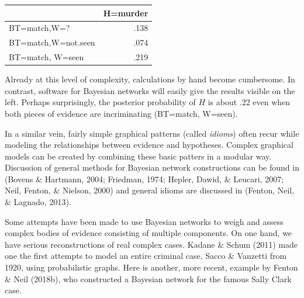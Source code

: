 \documentclass[11pt,dvipsnames,enabledeprecatedfontcommands]{scrartcl}
\begin{document}
\vspace{1mm}

\begin{minipage}[c]{0.4\linewidth}
\begin{tabular}{lr}
\toprule
  & H=murder\\
\midrule
BT=match,W=? & .138\\
BT=match,W=not.seen & .074\\
BT=match, W=seen & .219\\
\bottomrule
\end{tabular}
\end{minipage}
\begin{minipage}[c]{0.575\linewidth}
Already at this level of complexity, calculations by hand become cumbersome. In contrast,  software for Bayesian networks  will easily give the results visible on the left. Perhaps surprisingly, the posterior probability of $H$ is about .22 even when both pieces of evidence are incriminating (BT=match, W=seen).
\end{minipage}

\vspace{2mm}

In a similar vein, fairly simple graphical patterns (called
\emph{idioms}) often recur while modeling the relationships between
evidence and hypotheses. Complex graphical models can be created by
combining these basic patters in a modular way. Discussion of general
methods for Bayesian network constructions can be found in (Bovens \&
Hartmann, 2004; Friedman, 1974; Hepler, Dawid, \& Leucari, 2007; Neil,
Fenton, \& Nielson, 2000) and general idioms are discussed in (Fenton,
Neil, \& Lagnado, 2013).

Some attempts have been made to use Bayesian networks to weigh and
assess complex bodies of evidence consisting of multiple components. On
one hand, we have serious reconstructions of real complex cases. Kadane
\& Schum (2011) made one the first attempts to model an entire criminal
case, Sacco \& Vanzetti from 1920, using probabilistic graphs. Here is
another, more recent, example by Fenton \& Neil (2018b), who constructed
a Bayesian network for the famous Sally Clark case.

\noindent
\end{document}

